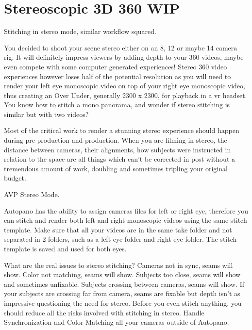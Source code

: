 \chapter{Stereoscopic 3D 360 WIP}
\pagecolor{white}
\label{chap:42}
\begin{fullwidth}

\problem

{\large Stitching in stereo mode, similar workflow squared. \par}

You decided to shoot your scene stereo either on an 8, 12 or maybe 14 camera rig. It will definitely impress viewers by adding depth to your 360 videos, maybe even compete with some computer generated experiences! Stereo 360 video experiences however loses half of the potential resolution as you will need to render your left eye monoscopic video on top of your right eye monoscopic video, thus creating an Over Under, generally 2300 x 2300, for playback in a vr headset. You know how to stitch a mono panorama, and wonder if stereo stitching is similar but with two videos?

\solution

Most of the critical work to render a stunning stereo experience should happen during pre-production and production. When you are filming in stereo, the distance between cameras, their alignments, how subjects were instructed in relation to the space are all things which can’t be corrected in post without a tremendous amount of work, doubling and sometimes tripling your original budget. 

{\large AVP Stereo Mode. \par}

Autopano has the ability to assign cameras files for left or right eye, therefore you can stitch and render both left and right monoscopic videos using the same stitch template. Make sure that all your videos are in the same take folder and not separated in 2 folders, such as a left eye folder and right eye folder. The stitch template is saved and used for both eyes. 


What are the real issues to stereo stitching? Cameras not in sync, seams will show. Color not matching, seams will show. Subjects too close, seams will show and sometimes unfixable. Subjects crossing between cameras, seams will show. If your subjects are crossing far from camera, seams are fixable but depth isn’t as impressive questioning the need for stereo. Before you even stitch anything, you should reduce all the risks involved with stitching in stereo. Handle Synchronization and Color Matching all your cameras outside of Autopano.


\end{fullwidth}
